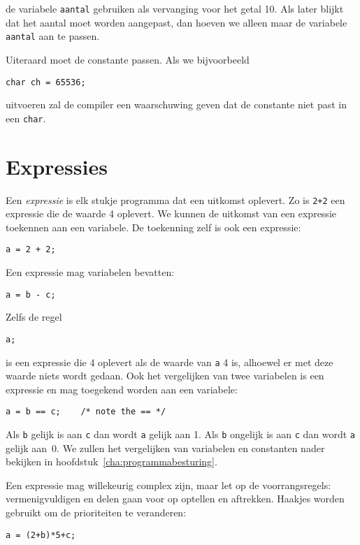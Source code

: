 de variabele \texttt{aantal} gebruiken als vervanging voor het getal 10. Als later blijkt dat het aantal moet worden aangepast, dan hoeven we alleen maar de variabele \texttt{aantal} aan te passen.

Uiteraard moet de constante passen. Als we bijvoorbeeld

\hspace*{1em}\texttt{char ch = 65536;}

uitvoeren zal de compiler een waarschuwing geven dat de constante niet past in een \texttt{char}.


\section{Expressies}
Een \textsl{expressie} is elk stukje programma dat een uitkomst oplevert. Zo is \texttt{2+2} een expressie die de waarde 4 oplevert. We kunnen de uitkomst van een expressie toekennen aan een variabele. De toekenning zelf is ook een expressie:

\hspace*{1em}\texttt{a = 2 + 2;}

Een expressie mag variabelen bevatten:

\hspace*{1em}\texttt{a = b - c;}

Zelfs de regel

\hspace*{1em}\texttt{a;}

is een expressie die 4 oplevert als de waarde van \texttt{a} 4 is, alhoewel er met deze waarde niets wordt gedaan. Ook het vergelijken van twee variabelen is een expressie en mag toegekend worden aan een variabele:

\hspace*{1em}\texttt{a = b == c; \ \ \  /* note the == */}

Als \texttt{b} gelijk is aan \texttt{c} dan wordt \texttt{a} gelijk aan 1. Als \texttt{b} ongelijk is aan \texttt{c} dan wordt \texttt{a} gelijk aan~0. We zullen het vergelijken van variabelen en constanten nader bekijken in hoofdstuk~\ref{cha:programmabesturing}.

Een expressie mag willekeurig complex zijn, maar let op de voorrangsregels: vermenigvuldigen en delen gaan voor op optellen en aftrekken. Haakjes worden gebruikt om de prioriteiten te veranderen:

\hspace*{1em}\texttt{a = (2+b)*5+c;}

